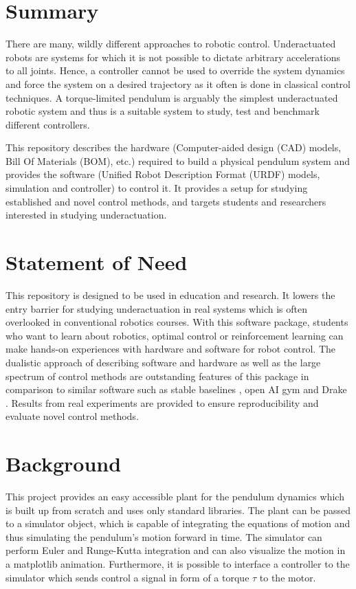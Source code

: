 \documentclass[onecolumn, letter paper]{report}
\begin{document}
\maketitle

\chapter{Summary}
There are many, wildly different approaches to robotic control.
Underactuated robots are systems for which it is not possible to dictate arbitrary accelerations to all joints. Hence, a controller cannot be used to override the system dynamics and force the system on a desired trajectory as it often is done in classical control techniques.
A torque-limited pendulum is arguably the simplest underactuated robotic system and thus is a suitable system to study, test and benchmark different controllers.

This repository describes the hardware (Computer-aided design (CAD) models, Bill Of Materials (BOM), etc.) required to build a
physical pendulum system and provides the software (Unified Robot Description Format (URDF) models, simulation and controller) to control it. It provides a setup for studying established and novel control methods, and targets students and researchers interested in studying underactuation.

\chapter{Statement of Need}
This repository is designed to be used in education and research. It lowers the entry barrier
for studying underactuation in real systems which is often overlooked in conventional robotics courses.
With this software package, students who want to learn about robotics, optimal control or reinforcement learning can make hands-on
experiences with hardware and software for robot control.
The dualistic approach of describing software and hardware as well as the large spectrum of control methods are outstanding features of this package in comparison to similar software such as stable baselines \autocite{stable-baselines3}, open AI gym \autocite{Brockman2016} and Drake \autocite{drake}.
Results from real experiments are provided to ensure reproducibility and evaluate novel control methods.

\chapter{Background}
This project provides an easy accessible plant for the pendulum dynamics which is built up from scratch and uses only standard libraries. The plant can be passed to a simulator object, which is capable of integrating the equations of motion and thus simulating the pendulum's motion forward in time. The simulator can perform Euler and Runge-Kutta integration and can also visualize the motion in a matplotlib animation. Furthermore, it is possible to interface a controller to the simulator which sends control a signal in form of a torque $\tau$ to the motor.
\end{document}
